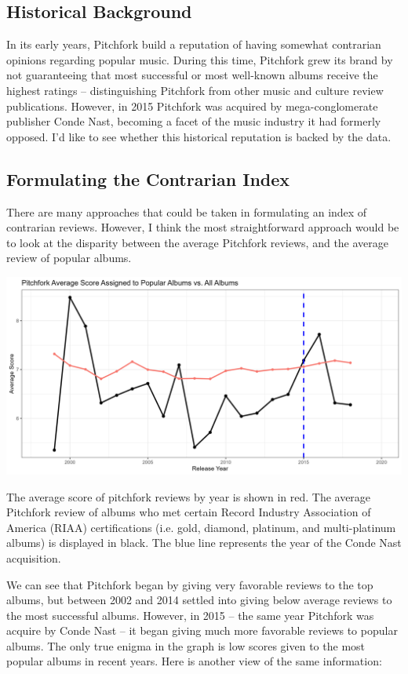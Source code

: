 \documentclass[a4paper,12pt]{article}
\begin{document}
\subsection{Historical Background}
In its early years, Pitchfork build a reputation of having somewhat contrarian opinions regarding popular music. During this time, Pitchfork grew its brand by not guaranteeing that most successful or most well-known albums receive the highest ratings -- distinguishing Pitchfork from other music and culture review publications. However, in 2015 Pitchfork was acquired by mega-conglomerate publisher Conde Nast, becoming a facet of the music industry it had formerly opposed. I'd like to see whether this historical reputation is backed by the data.

\subsection{Formulating the Contrarian Index}
There are many approaches that could be taken in formulating an index of contrarian reviews. However, I think the most straightforward approach would be to look at the disparity between the average Pitchfork reviews, and the average review of popular albums. 

\includegraphics[width = 0.95\linewidth]{"figures/contrarian_index.png"}

The average score of pitchfork reviews by year is shown in red. The average Pitchfork review of albums who met certain Record Industry Association of America (RIAA) certifications (i.e. gold, diamond, platinum, and multi-platinum albums) is displayed in black. The blue line represents the year of the Conde Nast acquisition.

We can see that Pitchfork began by giving very favorable reviews to the top albums, but between 2002 and 2014 settled into giving below average reviews to the most successful albums. However, in 2015 -- the same year Pitchfork was acquire by Conde Nast -- it began giving much more favorable reviews to popular albums. The only true enigma in the graph is low scores given to the most popular albums in recent years. Here is another view of the same information:
\end{document}
